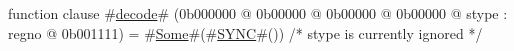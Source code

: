 function clause #\hyperref[zdecode]{decode}# (0b000000 @ 0b00000 @ 0b00000 @ 0b00000 @ stype : regno @ 0b001111) =
  #\hyperref[zSome]{Some}#(#\hyperref[zSYNC]{SYNC}#()) /* stype is currently ignored */
